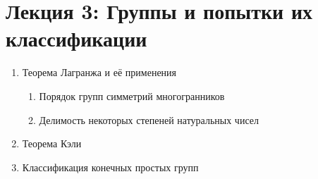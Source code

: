\documentclass[amsmath,amssymb,12pt]{revtex4}
\newif\ifimportant
\newcommand{\1}{\frac{1}{2}}
\begin{document}
\ifimportant
\medskip
\noindent
Подсказка
Число состояний кубика Рубика конечно; для каждого поворота есть обратный. 
Решение
Обозначим начальное состояние кубика Рубика за A. Пусть P=P1P2...Pn - некоторая последовательность поворотов. Обозначим через P(X) результат применения последовательности поворотов P к состоянию X, и через Pm(X) результат m-кратного применения последовательности поворотов P к состоянию X. Рассмотрим последовательность состояний A, P(A), P2(A), P3(A), ... Поскольку имеется лишь конечное число состояний кубика Рубика, то в этой последовательности встретится повторение, т.е. Pk(A)=Pn(A)=B для некоторых k, n, k<n. Для каждого поворота Pi кубика есть обратный поворот P-1i (т.е. такой поворот, что P-1i(Pi) = Pi(P-1i) есть тождественное преобразование). Таким образом, для последовательности поворотов P=P1P2...Pn имеется обратное преобразование P-1, определяемое как последовательное выполнение поворотов P-1n, P-1n-1, ... , P-11. Применяя преобразование P-1 к состоянию B=Pk(A)=Pn(A), мы получаем, что P-1(B)=Pk-1(A)=Pn-1(A). Проводя дальнейшие рассуждения подобным образом, мы получим совпадение состояний Pk-2(A)=Pn-2(A), ... , P1(A)=Pn-k+1(A). Таким образом, начальное состояние повторится после (n-k+1)-кратного выполнения последовательности поворотов P.
\fi











\newpage
\section*{\large Лекция 3: Группы и попытки их классификации}
\setcounter{prn}{0}

\begin{enumerate}
	\item Теорема Лагранжа и её применения
	\begin{enumerate}
		\item Порядок групп симметрий многогранников
		\item Делимость некоторых степеней натуральных чисел
	\end{enumerate}
	\item Теорема Кэли
	\item Классификация конечных простых групп
\end{enumerate}
\end{document}
